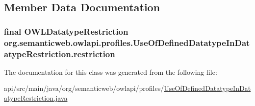 \subsection{Member Data Documentation}
\hypertarget{classorg_1_1semanticweb_1_1owlapi_1_1profiles_1_1_use_of_defined_datatype_in_datatype_restriction_a8f2c5c289b07829ecfbc88ab722a0a7c}{
\subsubsection[{restriction}]{\setlength{\rightskip}{0pt plus 5cm}final {\bf O\-W\-L\-Datatype\-Restriction} org.\-semanticweb.\-owlapi.\-profiles.\-Use\-Of\-Defined\-Datatype\-In\-Datatype\-Restriction.\-restriction\hspace{0.3cm}{\ttfamily [private]}}}\label{classorg_1_1semanticweb_1_1owlapi_1_1profiles_1_1_use_of_defined_datatype_in_datatype_restriction_a8f2c5c289b07829ecfbc88ab722a0a7c}


The documentation for this class was generated from the following file\-:\begin{DoxyCompactItemize}
\item 
api/src/main/java/org/semanticweb/owlapi/profiles/\hyperlink{_use_of_defined_datatype_in_datatype_restriction_8java}{Use\-Of\-Defined\-Datatype\-In\-Datatype\-Restriction.\-java}\end{DoxyCompactItemize}

